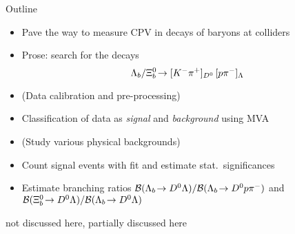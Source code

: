 \begin{frame}{Outline}
    \begin{itemize}
        \item Pave the way to measure CPV in decays of baryons at colliders
        \item Prose: search for the decays $${{\Lambda}_{b}}/{{\Xi}^0_{b}}\!\rightarrow [{{K}^-}{{\pi}^+}]_{{{D}^0}} \, [{p}{{\pi}^-}]_{{\Lambda}}$$
    \end{itemize}

    \begin{itemize}
        \item (Data calibration and pre-processing\ftntdagger)
        \item Classification of data as \textit{signal} and \textit{background} using MVA\ftntasterix
        \item (Study various physical backgrounds\ftntdagger)
        \item Count signal events with fit and estimate stat.\ significances\ftntasterix
        \item Estimate branching ratios $\mathcal{B}({{\Lambda}_{b}}\!\rightarrow {\ensuremath{{D}^0}}{\ensuremath{\Lambda}})/\mathcal{B}({{\Lambda}_{b}}\!\rightarrow {\ensuremath{{D}^0}}{\ensuremath{p}}{\ensuremath{{\pi}^-}})$\ftntdagger{} and $\mathcal{B}({{\Xi}^0_{b}}\!\rightarrow {\ensuremath{{D}^0}}{\ensuremath{\Lambda}})/\mathcal{B}({{\Lambda}_{b}}\!\rightarrow {\ensuremath{{D}^0}}{\ensuremath{\Lambda}})$\ftntasterix
    \end{itemize}

    \footnotesize
    \ftntdagger not discussed here, \ftntasterix partially discussed here
\end{frame}
